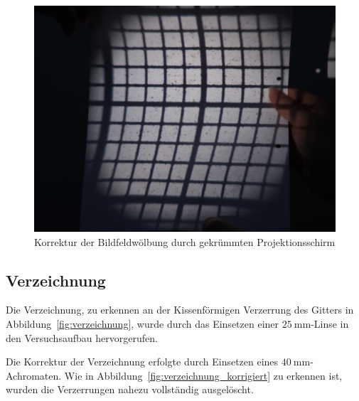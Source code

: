 \begin{figure}[h!]
	\includegraphics[width=\linewidth]{img/Bildwoelbung/Prakt_Linsenfehler_2015_06_04_076}
	\caption{Korrektur der Bildfeldwölbung durch gekrümmten Projektionsschirm}
	\label{fig:bildwoelbung_korrigiert}
\end{figure}

\subsection{Verzeichnung}

Die Verzeichnung, zu erkennen an der Kissenförmigen Verzerrung des Gitters in Abbildung~\ref{fig:verzeichnung}, wurde durch das Einsetzen einer $\SI{25}{\milli\meter}$-Linse in den Versuchsaufbau hervorgerufen.

Die Korrektur der Verzeichnung erfolgte durch Einsetzen eines $\SI{40}{\milli\meter}$-Achromaten. Wie in Abbildung~\ref{fig:verzeichnung_korrigiert} zu erkennen ist, wurden die Verzerrungen nahezu vollständig ausgelöscht.

